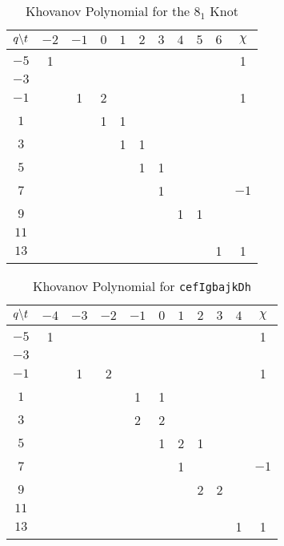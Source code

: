 \documentclass{article}
\theoremstyle{plain}
\begin{document}
        \begin{table}[H]
            \centering
            \begin{tabular}{| c | c | c | c | c | c | c | c | c | c | c |}
                \hline
                $q\symbol{92}t$&$-2$&$-1$&$0$&$1$&$2$&$3$&$4$&$5$&$6$&$\chi$\\
                \hline
                $-5$&1&&&&&&&&&1\\
                \hline
                $-3$&&&&&&&&&&\\
                \hline
                $-1$&&1&2&&&&&&&1\\
                \hline
                $1$&&&1&1&&&&&&\\
                \hline
                $3$&&&&1&1&&&&&\\
                \hline
                $5$&&&&&1&1&&&&\\
                \hline
                $7$&&&&&&1&&&&$-1$\\
                \hline
                $9$&&&&&&&1&1&&\\
                \hline
                $11$&&&&&&&&&&\\
                \hline
                $13$&&&&&&&&&1&1\\
                \hline
            \end{tabular}
            \caption{Khovanov Polynomial for the $8_{1}$ Knot}
            \label{table:m_6_kho}
        \end{table}
        \begin{table}[H]
            \centering
            \begin{tabular}{| c | c | c | c | c | c | c | c | c | c | c |}
                \hline
                $q\symbol{92}t$&$-4$&$-3$&$-2$&$-1$&$0$&$1$&$2$&$3$&$4$&$\chi$\\
                \hline
                $-5$&1&&&&&&&&&1\\
                \hline
                $-3$&&&&&&&&&&\\
                \hline
                $-1$&&1&2&&&&&&&1\\
                \hline
                $1$&&&&1&1&&&&&\\
                \hline
                $3$&&&&2&2&&&&&\\
                \hline
                $5$&&&&&1&2&1&&&\\
                \hline
                $7$&&&&&&1&&&&$-1$\\
                \hline
                $9$&&&&&&&2&2&&\\
                \hline
                $11$&&&&&&&&&&\\
                \hline
                $13$&&&&&&&&&1&1\\
                \hline
            \end{tabular}
            \caption{Khovanov Polynomial for \texttt{cefIgbajkDh}}
            \label{table:cefIgbajkDh_kho}
        \end{table}
\end{document}
